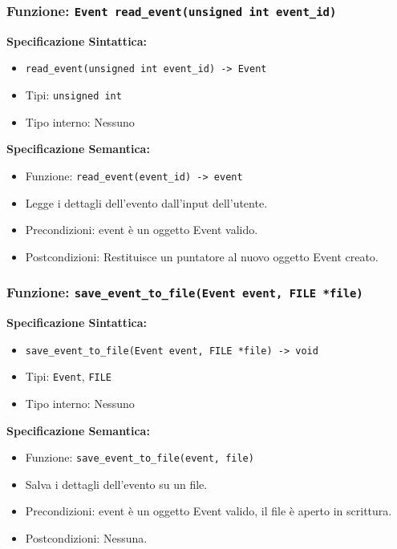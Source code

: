 \documentclass[11pt]{scrartcl} %
\begin{document}
\subsubsection{Funzione: \texttt{Event read\_event(unsigned int event\_id)}}

\textbf{Specificazione Sintattica:}
\begin{itemize}
\item \texttt{read\_event(unsigned int event\_id) -> Event}
\item Tipi: \texttt{unsigned int}
\item Tipo interno: Nessuno
\end{itemize}

\textbf{Specificazione Semantica:}
\begin{itemize}
\item Funzione: \texttt{read\_event(event\_id) -> event}
\item Legge i dettagli dell'evento dall'input dell'utente.
\item Precondizioni: event è un oggetto Event valido.
\item Postcondizioni: Restituisce un puntatore al nuovo oggetto Event creato.
\end{itemize}

\subsubsection{Funzione: \texttt{save\_event\_to\_file(Event event, FILE *file)}}

\textbf{Specificazione Sintattica:}
\begin{itemize}
\item \texttt{save\_event\_to\_file(Event event, FILE *file) -> void}
\item Tipi: \texttt{Event}, \texttt{FILE}
\item Tipo interno: Nessuno
\end{itemize}

\textbf{Specificazione Semantica:}
\begin{itemize}
\item Funzione: \texttt{save\_event\_to\_file(event, file)}
\item Salva i dettagli dell'evento su un file.
\item Precondizioni: event è un oggetto Event valido, il file è aperto in scrittura.
\item Postcondizioni: Nessuna.
\end{itemize}
\end{document}
